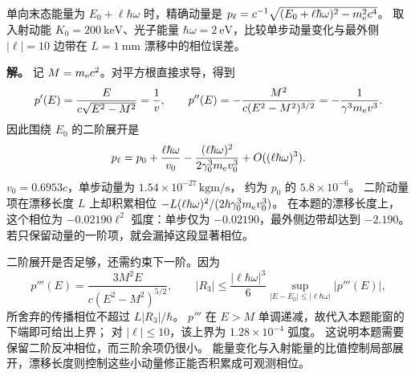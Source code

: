 \begin{exbox}
\label{chap:feqo-phenomena}
单向末态能量为 $E_0+\ell\hbar\omega$ 时，精确动量是
$p_\ell=c^{-1}\sqrt{(E_0+\ell\hbar\omega)^2-m_{\rm e}^2c^4}$。
取入射动能 $K_0=\SI{200}{\kilo\electronvolt}$、光子能量
$\hbar\omega=\SI{2}{\electronvolt}$，比较单步动量变化与最外侧 $|\ell|=10$ 边带在
$L=\SI{1}{\milli\metre}$ 漂移中的相位误差。

\textbf{解。} 记 $M=m_{\rm e}c^2$。对平方根直接求导，得到
\[
p'(E)=\frac{E}{c\sqrt{E^2-M^2}}=\frac1v,\qquad
p''(E)=-\frac{M^2}{c(E^2-M^2)^{3/2}}=-\frac1{\gamma^3m_{\rm e}v^3}.
\]
因此围绕 $E_0$ 的二阶展开是
\begin{equation}
p_\ell=p_0+\frac{\ell\hbar\omega}{v_0}
-\frac{(\ell\hbar\omega)^2}{2\gamma_0^3m_{\rm e}v_0^3}
+O((\ell\hbar\omega)^3).
\label{eq:feqo-sideband-momentum-recoil}
\end{equation}
$v_0=0.6953c$，单步动量为 $1.54\times10^{-27}\,\si{\kilogram\metre\per\second}$，
约为 $p_0$ 的 $5.8\times10^{-6}$。
二阶动量项在漂移长度 $L$ 上却积累相位
$-L(\ell\hbar\omega)^2/(2\hbar\gamma_0^3m_{\rm e}v_0^3)$。
在本题的漂移长度上，这个相位为 $-0.02190\ell^2$ 弧度：单步仅为
$-0.02190$，最外侧边带却达到 $-2.190$。若只保留动量的一阶项，就会漏掉这段显著相位。

二阶展开是否足够，还需约束下一阶。因为
\[
p'''(E)=\frac{3M^2E}{c(E^2-M^2)^{5/2}},\qquad
|R_3|\le\frac{|\ell\hbar\omega|^3}{6}
\sup_{|E-E_0|\le|\ell\hbar\omega|}|p'''(E)|,
\]
所舍弃的传播相位不超过 $L|R_3|/\hbar$。
$p'''$ 在 $E>M$ 单调递减，故代入本题能窗的下端即可给出上界；
对 $|\ell|\le10$，该上界为 $1.28\times10^{-4}$ 弧度。
这说明本题需要保留二阶反冲相位，而三阶余项仍很小。
能量变化与入射能量的比值控制局部展开，漂移长度则控制这些小动量修正能否积累成可观测相位。
\end{exbox}
